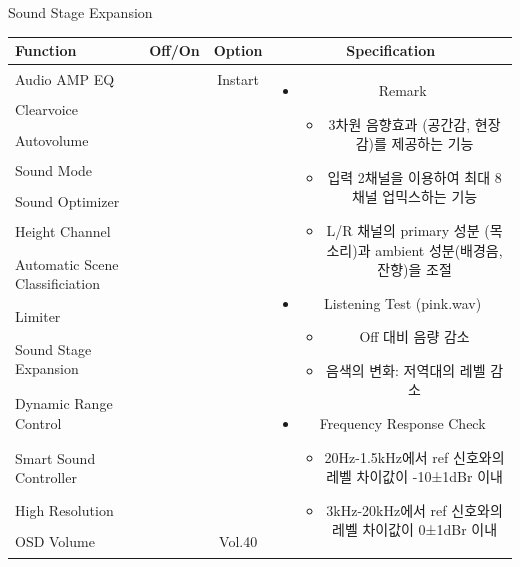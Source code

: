 \documentclass{beamer}
\begin{document}
\begin{frame}[t]{Sound Stage Expansion}
\begin{tiny}
\begin{tabular}{@{}lccc@{}}
\toprule
Function & Off/On & Option & Specification \\
\midrule
Audio AMP EQ & \color{black}{Off} & Instart &
\multirow{13}{60mm}{
\begin{itemize}
\item Remark
	\begin{itemize}
	\item 3차원 음향효과 (공간감, 현장감)를 제공하는 기능
	\item 입력 2채널을 이용하여 최대 8채널 업믹스하는 기능
	\item L/R 채널의 primary 성분 (목소리)과 ambient 성분(배경음, 잔향)을 조절
	\end{itemize}
\item Listening Test (pink.wav)
	\begin{itemize}
	\item Off 대비 음량 감소
	\item 음색의 변화: 저역대의 레벨 감소
	\end{itemize}
\item Frequency Response Check
  \begin{itemize}
  \item 20Hz-1.5kHz에서 ref 신호와의 레벨 차이값이 -10±1dBr 이내
  \item 3kHz-20kHz에서 ref 신호와의 레벨 차이값이 0±1dBr 이내
  \end{itemize}
\end{itemize}
} \\
Clearvoice & \color{black}{Off} & & \\
Autovolume & \color{black}{Off} & & \\
Sound Mode & \color{black}{Off} & & \\
Sound Optimizer & \color{black}{Off} & & \\
Height Channel & \color{black}{Off} & & \\
Automatic Scene Classificiation & \color{black}{Off} & & \\
Limiter & \color{black}{Off} & & \\
Sound Stage Expansion & \color{blue}{On} & & \\
Dynamic Range Control & \color{black}{Off} & & \\
Smart Sound Controller & \color{black}{Off} & & \\
High Resolution & \color{black}{Off} & & \\
OSD Volume & \color{blue}{On} & Vol.40 & \\
\midrule
\end{tabular}
\end{tiny}


\end{frame}
\end{document}
